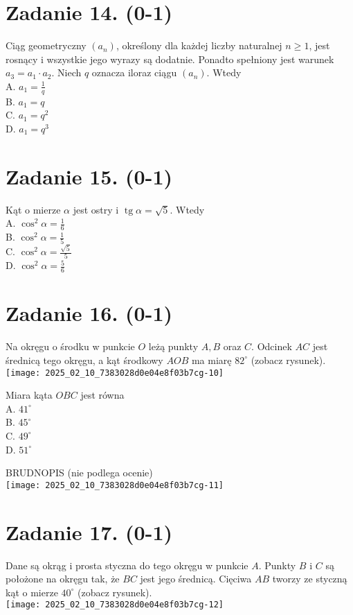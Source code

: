 \documentclass[10pt]{article}
\begin{document}
\section*{Zadanie 14. (0-1)}
Ciąg geometryczny \(\left(a_{n}\right)\), określony dla każdej liczby naturalnej \(n \geq 1\), jest rosnący i wszystkie jego wyrazy są dodatnie. Ponadto spełniony jest warunek \(a_{3}=a_{1} \cdot a_{2}\). Niech \(q\) oznacza iloraz ciągu \(\left(a_{n}\right)\). Wtedy\\
A. \(a_{1}=\frac{1}{q}\)\\
B. \(a_{1}=q\)\\
C. \(a_{1}=q^{2}\)\\
D. \(a_{1}=q^{3}\)

\section*{Zadanie 15. (0-1)}
Kąt o mierze \(\alpha\) jest ostry i \(\operatorname{tg} \alpha=\sqrt{5}\). Wtedy\\
A. \(\cos ^{2} \alpha=\frac{1}{6}\)\\
B. \(\cos ^{2} \alpha=\frac{1}{5}\)\\
C. \(\cos ^{2} \alpha=\frac{\sqrt{5}}{5}\)\\
D. \(\cos ^{2} \alpha=\frac{5}{6}\)

\section*{Zadanie 16. (0-1)}
Na okręgu o środku w punkcie \(O\) leżą punkty \(A, B\) oraz \(C\). Odcinek \(A C\) jest średnicą tego okręgu, a kąt środkowy \(A O B\) ma miarę \(82^{\circ}\) (zobacz rysunek).\\
\texttt{[image: 2025\_02\_10\_7383028d0e04e8f03b7cg-10]}

Miara kąta \(O B C\) jest równa\\
A. \(41^{\circ}\)\\
B. \(45^{\circ}\)\\
C. \(49^{\circ}\)\\
D. \(51^{\circ}\)

BRUDNOPIS (nie podlega ocenie)\\
\texttt{[image: 2025\_02\_10\_7383028d0e04e8f03b7cg-11]}

\section*{Zadanie 17. (0-1)}
Dane są okrąg i prosta styczna do tego okręgu w punkcie \(A\). Punkty \(B\) i \(C\) są położone na okręgu tak, że \(B C\) jest jego średnicą. Cięciwa \(A B\) tworzy ze styczną kąt o mierze \(40^{\circ}\) (zobacz rysunek).\\
\texttt{[image: 2025\_02\_10\_7383028d0e04e8f03b7cg-12]}
\end{document}
